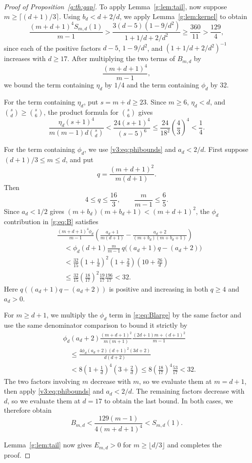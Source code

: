 \documentclass[11pt]{article}
\numberwithin{equation}{section}
\theoremstyle{remark}\newtheorem{remark}[theorem]{Remark}
\begin{document}
\begin{proof}[Proof of Proposition~\ref{g:th:gap}]
To apply Lemma~\ref{g:lem:tail}, now suppose $m\ge\lceil(d+1)/3\rceil$.
Using $b_d<d+2/d$, we apply Lemma~\ref{g:lem:kernel} to obtain
\[
 \frac{(m+d+1)^4S_{m,d}(1)}{m-1}
 >\frac{3(d-5)(1-9/d^2)}{1+1/d+2/d^2}
 \ge\frac{360}{11}>\frac{129}{4},
\]
since each of the positive factors $d-5$, $1-9/d^2$, and
$(1+1/d+2/d^2)^{-1}$ increases with $d\ge17$.
After multiplying the two terms of $B_{m,d}$ by
\[
 \frac{(m+d+1)^4}{m-1},
\]
we bound the term containing $\eta_d$ by $1/4$ and the term containing
$\phi_d$ by $32$.

For the term containing $\eta_d$, put $s=m+d\ge23$.
Since $m\ge6$, $\eta_d<d$, and $\binom{s}{d}\ge\binom{s}{6}$,
the product formula for $\binom{s}{6}$ gives
\[
 \frac{\eta_d(s+1)^4}{m(m-1)d\binom{s}{d}}
 <\frac{24(s+1)^4}{(s-5)^6}
 \le\frac{24}{18^2}\left(\frac43\right)^4<\frac14.
\]

For the term containing $\phi_d$, we use \eqref{v3:eq:phibounds} and
$a_d<2/d$. First suppose $(d+1)/3\le m\le d$, and put
\[
 q=\frac{(m+d+1)^2}{m(d+1)}.
\]
Then
\[
 4\le q\le\frac{16}3,\qquad \frac{m}{m-1}\le\frac65.
\]
Since $a_d<1/2$ gives
$(m+b_d)(m+b_d+1)<(m+d+1)^2$, the $\phi_d$ contribution in
\eqref{g:eq:B} satisfies
\[
\begin{aligned}
 &\frac{(m+d+1)^4\phi_d}{m-1}\left(\frac{a_d+1}{m(d+1)}
       -\frac{a_d+2}{(m+b_d)(m+b_d+1)}\right)\\
 &\quad<\phi_d(d+1)\frac{m}{m-1}\,
          q\bigl((a_d+1)q-(a_d+2)\bigr)\\
 &\quad<\frac{32}{15}\left(1+\frac1d\right)^2
       \left(1+\frac2d\right)\left(10+\frac{26}d\right)\\
 &\quad\le\frac{32}{15}\left(\frac{18}{17}\right)^2
       \frac{19}{17}\frac{196}{17}<32.
\end{aligned}
\]
Here $q((a_d+1)q-(a_d+2))$ is positive and increasing in both
$q\ge4$ and $a_d>0$.

For $m\ge d+1$, we multiply the $\phi_d$ term in
\eqref{g:eq:Blarge} by the same factor and use the same denominator
comparison to bound it strictly by
\[
\begin{aligned}
 &\phi_d(a_d+2)\frac{(m+d+1)^2}{m(m+1)}
 \frac{(2d+1)m+(d+1)^2}{m-1}\\
 &\quad\le\frac{4\phi_d(a_d+2)(d+1)^2(3d+2)}{d(d+2)}\\
 &\quad<8\left(1+\frac1d\right)^4\left(3+\frac2d\right)
 \le8\left(\frac{18}{17}\right)^4\frac{53}{17}<32.
\end{aligned}
\]
The two factors involving $m$ decrease with $m$, so we evaluate them
at $m=d+1$, then apply \eqref{v3:eq:phibounds} and $a_d<2/d$.
The remaining factors decrease with $d$, so we evaluate them at $d=17$
to obtain the last bound.
In both cases, we therefore obtain
\[
 B_{m,d}<\frac{129(m-1)}{4(m+d+1)^4}<S_{m,d}(1).
\]

Lemma~\ref{g:lem:tail} now gives $E_{m,d}>0$ for
$m\ge\lfloor d/3\rfloor$ and completes the proof.
\end{proof}
\end{document}
